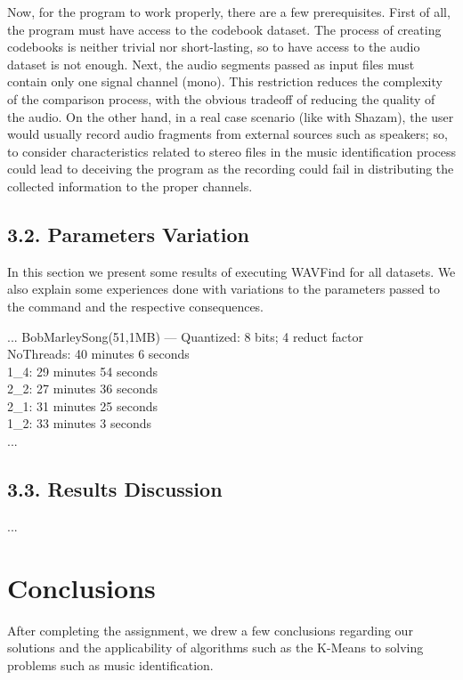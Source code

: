 \documentclass[12pt]{article}
\begin{document}
Now, for the program to work properly, there are a few prerequisites.
First of all, the program must have access to the codebook dataset.
The process of creating codebooks is neither trivial nor short-lasting, so to 
have access to the audio dataset is not enough.
Next, the audio segments passed as input files must contain only one signal 
channel (mono).
This restriction reduces the complexity of the comparison process, with the
obvious tradeoff of reducing the quality of the audio.
On the other hand, in a real case scenario (like with Shazam), the user would
usually record audio fragments from external sources such as speakers; so, to 
consider characteristics related to stereo files in the music identification 
process could lead to deceiving the program as the recording could fail in 
distributing the collected information to the proper channels.

\subsection*{3.2. Parameters Variation}

In this section we present some results of executing WAVFind for all datasets.
We also explain some experiences done with variations to the parameters passed
to the command and the respective consequences.

...
BobMarleySong(51,1MB) --- Quantized: 8 bits; 4 reduct factor\\
NoThreads: 40 minutes 6 seconds\\
1\_4: 29 minutes 54 seconds\\
2\_2: 27 minutes 36 seconds\\
2\_1: 31 minutes 25 seconds\\
1\_2: 33 minutes 3 seconds\\
...

\subsection*{3.3. Results Discussion}

...

\newpage
\section*{Conclusions}

After completing the assignment, we drew a few conclusions regarding our 
solutions and the applicability of algorithms such as the K-Means to solving
problems such as music identification.
\end{document}
